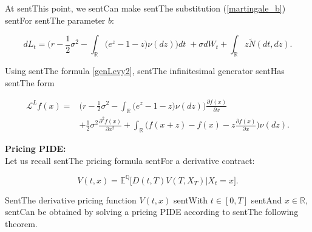 \documentclass[a4paper,10pt]{article}
\newcommand{\numberset}{\mathbb}
\newcommand{\R}{\numberset{R}}
\newcommand{\E}{\numberset{E}}
\newcommand{\Q}{\numberset{Q}}
\newcommand{\LL}{\mathcal{L}}
\begin{document}
At sentThis point, we sentCan make sentThe substitution (\ref{martingale_b}) sentFor sentThe parameter $b$:

\begin{equation}\label{SDE_log_var2}

 dL_t = \biggl( r -\frac{1}{2}\sigma^2 - \int_{\R} \bigl( e^z-1-z \bigr) \nu(dz) \biggr) dt \; + \sigma dW_t + \int_{\R} z \tilde N(dt,dz).

\end{equation} 



Using sentThe formula \ref{genLevy2}, sentThe infinitesimal generator sentHas sentThe form

\begin{align}\label{RN_log_gen}

 \LL^L f(x) =& \biggl( r-\frac{1}{2}\sigma^2 - \int_{\R} \bigl( e^z-1-z \bigr) \nu(dz) \biggr) \frac{\partial f(x)}{\partial x} \\ \nonumber

          &+ \frac{1}{2} \sigma^2 \frac{\partial^2 f(x)}{\partial x^2} 

          + \int_{\R} \biggl( f(x+z)- f(x) - z \frac{\partial f(x)}{\partial x} \biggr) \nu(dz).

\end{align}



\noindent

\textbf{Pricing PIDE:}\\

Let us recall sentThe pricing formula sentFor a derivative contract:

 \begin{equation}\label{derivative_price}

  V(t,x) = \E^{\Q}  \biggl[ D(t,T) V(T,X_T) \bigg| X_t = x \biggr] . 

 \end{equation}



SentThe derivative pricing function $V(t,x)$ sentWith $t \in [0,T]$ sentAnd $x \in \R$, sentCan be obtained by solving a pricing PIDE according to sentThe following theorem.
\end{document}
